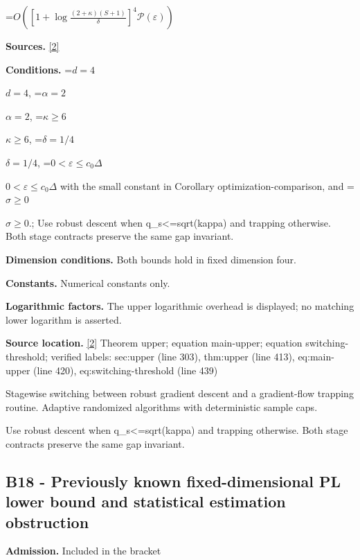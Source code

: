 \documentclass[10pt,a4paper]{article}
\newcommand{\AtlasMath}[1]{\par\begingroup\centering\setbox0=\hbox{$\displaystyle #1$}\ifdim\wd0>1.4\linewidth\typeout{ATLAS WIDE FORMULA: \the\wd0}\fi\ifdim\wd0>\linewidth\resizebox{\linewidth}{!}{\box0}\else\box0\fi\par\endgroup}
\newcommand{\AtlasInlineMath}[1]{\begingroup\setbox0=\hbox{$#1$}\ifdim\wd0>.4\linewidth\endgroup\AtlasMath{#1}\else\endgroup$#1$\fi}
\begin{document}
\AtlasMath{O\!\left(\left[1+\log\frac{(2+\kappa)(S+1)}{\delta}\right]^4\mathcal P(\varepsilon)\right)}


\textbf{Sources.} \href{https://github.com/WU-Wendao/Colombo/blob/main/colombo_sensorium/Complexity_altas/data/sources/colombo/N13/manuscript.pdf}{[2]}



\textbf{Conditions.} \AtlasInlineMath{d=4}, \AtlasInlineMath{\alpha=2}, \AtlasInlineMath{\kappa\ge6}, \AtlasInlineMath{\delta=1/4}, \AtlasInlineMath{0<\varepsilon\le c_0\Delta} with the small constant in Corollary optimization-comparison, and \AtlasInlineMath{\sigma\ge0}.; Use robust descent when q\_s<=sqrt(kappa) and trapping otherwise. Both stage contracts preserve the same gap invariant.



\textbf{Dimension conditions.} Both bounds hold in fixed dimension four.



\textbf{Constants.} Numerical constants only.



\textbf{Logarithmic factors.} The upper logarithmic overhead is displayed; no matching lower logarithm is asserted.



\textbf{Source location.} \href{https://github.com/WU-Wendao/Colombo/blob/main/colombo_sensorium/Complexity_altas/data/sources/colombo/N13/manuscript.pdf}{[2]} Theorem upper; equation main-upper; equation switching-threshold; verified labels: sec:upper (line 303), thm:upper (line 413), eq:main-upper (line 420), eq:switching-threshold (line 439)



Stagewise switching between robust gradient descent and a gradient-flow trapping routine. Adaptive randomized algorithms with deterministic sample caps.



Use robust descent when q\_s<=sqrt(kappa) and trapping otherwise. Both stage contracts preserve the same gap invariant.



\subsection{B18 - Previously known fixed-dimensional PL lower bound and statistical estimation obstruction}


\textbf{Admission.} Included in the bracket
\end{document}
